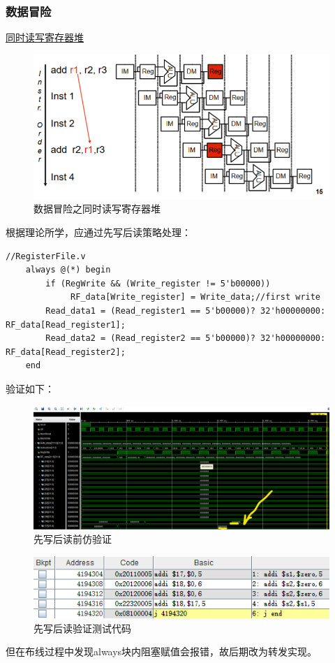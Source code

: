 \documentclass[10pt]{article}
\begin{document}
\subsubsection{数据冒险}
\underline{\large 同时读写寄存器堆}
\begin{figure}[H]
    \centering
    \includegraphics[scale=0.4]{reguse.png}
    \caption{数据冒险之同时读写寄存器堆}
    \end{figure}

根据理论所学，应通过先写后读策略处理：
\begin{lstlisting}[style={verilog-style}]
    //RegisterFile.v
    always @(*) begin
        if (RegWrite && (Write_register != 5'b00000))
             RF_data[Write_register] = Write_data;//first write
        Read_data1 = (Read_register1 == 5'b00000)? 32'h00000000: RF_data[Read_register1];
        Read_data2 = (Read_register2 == 5'b00000)? 32'h00000000: RF_data[Read_register2];
    end
\end{lstlisting}
验证如下：
\begin{figure}[H]
    \centering
    \includegraphics[scale=0.43]{fwtr.png}
    \caption{先写后读前仿验证}
    \end{figure}
    \begin{figure}[H]
        \centering
        \includegraphics[scale=0.9]{fwtrx.png}
        \caption{先写后读验证测试代码}
        \end{figure}
但在布线过程中发现always块内阻塞赋值会报错，故后期改为转发实现。
\end{document}

